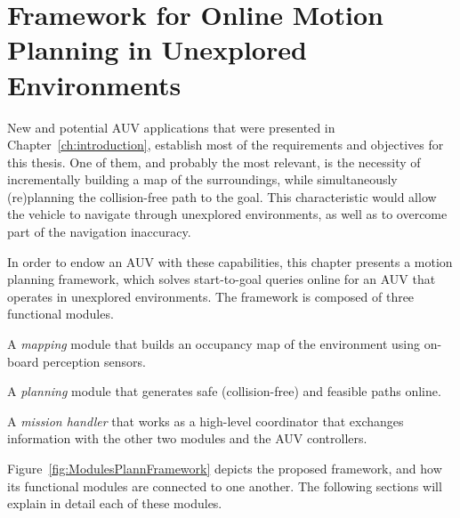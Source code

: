 
\chapter{Framework for Online Motion Planning in Unexplored Environments}
\label{ch:plann_online}



\ifpdf
    \graphicspath{{5_planning_online/figures/PNG/}{5_planning_online/figures/PDF/}{5_planning_online/figures/}}
\else
    \graphicspath{{5_planning_online/figures/EPS/}{5_planning_online/figures/}}
\fi


New and potential \ac{AUV} applications that were presented in
Chapter~\ref{ch:introduction}, establish most of the requirements and objectives
for this thesis. One of them, and probably the most relevant, is the necessity
of incrementally building a map of the surroundings, while simultaneously
(re)planning the collision-free path to the goal. This characteristic would
allow the vehicle to navigate through unexplored environments, as well as to
overcome part of the navigation inaccuracy.

In order to endow an \ac{AUV} with these capabilities, this chapter presents a
motion planning framework, which solves start-to-goal queries online for an
\ac{AUV} that operates in unexplored environments. The framework is composed of
three functional modules. \begin{inparaenum}[1)]
\item A \textit{mapping} module that builds an occupancy map of the
environment using on-board perception sensors.
\item A \textit{planning} module that generates safe (collision-free) and
feasible paths online.
\item A \textit{mission handler} that works as a high-level coordinator that
exchanges information with the other two modules and the \ac{AUV} controllers.
\end{inparaenum}
Figure~\ref{fig:ModulesPlannFramework} depicts the proposed framework, and how
its functional modules are connected to one another. The following sections will
explain in detail each of these modules.

